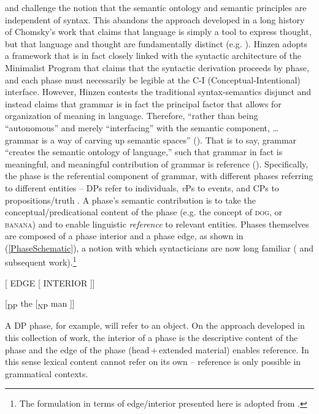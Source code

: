 \documentclass[output=paper
,modfonts
,nonflat
]{langsci/langscibook}
\begin{document}
\citet{Hinzen:2006, Hinzen:2012} and \citet{HinzenSheehan:2013} challenge the notion that the semantic ontology and semantic principles are independent of syntax. This abandons the approach developed in a long history of Chomsky’s work that claims that language is simply a tool to express thought, but that language and thought are fundamentally distinct (e.g. \citealt{Chomsky:2000b}). Hinzen adopts a framework that is in fact closely linked with the syntactic architecture of the Minimalist Program \citep{Chomsky2000,Chomsky:2001,Chomsky2008} that claims that the syntactic derivation proceeds by phase, and each phase must necessarily be legible at the \mbox{C-I} (Conceptual-Intentional) interface. However, Hinzen contests the traditional syntax-seman\-tics disjunct and instead claims that grammar is in fact the principal factor that allows for organization of meaning in language. Therefore, ``rather than being ``autonomous'' and merely ``interfacing'' with the semantic component, … grammar is a way of carving up semantic spaces'' (\citealt[311]{Hinzen:2012}).  That is to say, grammar ``creates the semantic ontology of language,'' such that grammar in fact is meaningful, and meaningful contribution of grammar is reference (\citealt[311]{Hinzen:2012}). Specifically, the phase is the referential component of grammar, with different phases referring to different entities -- DPs refer to individuals, \textit{v}Ps to events, and CPs to propositions/truth \citep{HinzenSheehan:2013, SheehanHinzen:2011}.
A phase's semantic contribution is to take the conceptual/predicational content of the phase (e.g. the concept of \textsc{dog}, or \textsc{banana}) and to enable linguistic \textit{reference} to relevant entities. Phases themselves are composed of a phase interior and a phase edge, as shown in (\ref{PhaseSchematic}), a notion with which syntacticians are now long familiar (\citealt{Chomsky:2001} and subsequent work).\footnote{The formulation in terms of edge/interior presented here is adopted from \citet{HinzenSheehan:2013}.} 



\ea	 \label{PhaseSchematic}
{[} EDGE [ INTERIOR ]]
\z

\ea 
{[}\textsubscript{DP} the [\textsubscript{NP} man ]]
\z

\noindent A DP phase, for example, will refer to an object. On the approach developed in this collection of work, the interior of a phase is the descriptive content of the phase and the edge of the phase (head\,+\,extended material) enables reference. In this sense lexical content cannot refer on its own -- reference is only possible in grammatical contexts. 
\end{document}
